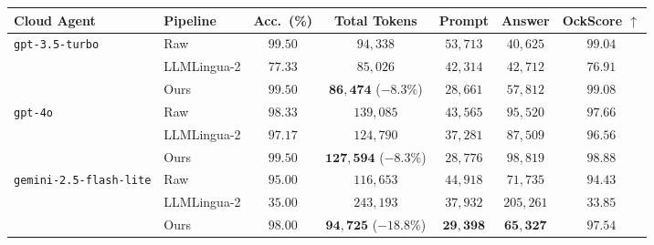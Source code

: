 \documentclass[11pt,a4paper,twocolumn]{article}
\begin{document}
\begin{table}[t]
\centering
\small
\setlength{\tabcolsep}{4pt}
\begin{tabular}{llccccc}
\toprule
\textbf{Cloud Agent} & \textbf{Pipeline} & \textbf{Acc.\ (\%)} & \textbf{Total Tokens} & \textbf{Prompt} & \textbf{Answer} & \textbf{OckScore $\uparrow$} \\
\midrule
\multirow{3}{*}{\texttt{gpt-3.5-turbo}}        & Raw         & $99.50$          & $94{,}338$                          & $53{,}713$          & $40{,}625$          & $99.04$ \\
                                               & LLMLingua-2 & $77.33$          & $85{,}026$                          & $42{,}314$          & $42{,}712$          & $76.91$ \\
                                               & Ours        & $\mathbf{99.50}$ & $\mathbf{86{,}474}$ ($-8.3\%$)      & $28{,}661$          & $57{,}812$          & $\mathbf{99.08}$ \\
\midrule
\multirow{3}{*}{\texttt{gpt-4o}}               & Raw         & $98.33$          & $139{,}085$                         & $43{,}565$          & $95{,}520$          & $97.66$ \\
                                               & LLMLingua-2 & $97.17$          & $124{,}790$                         & $37{,}281$          & $87{,}509$          & $96.56$ \\
                                               & Ours        & $\mathbf{99.50}$ & $\mathbf{127{,}594}$ ($-8.3\%$)     & $28{,}776$          & $98{,}819$          & $\mathbf{98.88}$ \\
\midrule
\multirow{3}{*}{\texttt{gemini-2.5-flash-lite}}& Raw         & $95.00$          & $116{,}653$                         & $44{,}918$          & $71{,}735$          & $94.43$ \\
                                               & LLMLingua-2 & $35.00$          & $243{,}193$                         & $37{,}932$          & $205{,}261$         & $33.85$ \\
                                               & Ours        & $\mathbf{98.00}$ & $\mathbf{94{,}725}$ ($-18.8\%$)     & $\mathbf{29{,}398}$ & $\mathbf{65{,}327}$ & $\mathbf{97.54}$ \\
\bottomrule
\end{tabular}

\end{table}
\end{document}
